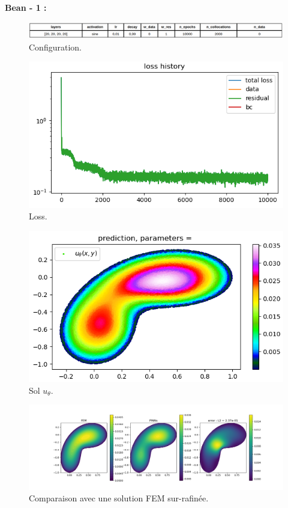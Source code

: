 \documentclass[french]{article}
\begin{document}
	\textbf{Bean - 1 :}
	
	\begin{figure}[H]
		\centering
		\includegraphics[width=\linewidth]{"poisson/bean/config_1.png"}
		\caption{Configuration.}
	\end{figure}
	
	\begin{minipage}{0.48\linewidth}
		\begin{figure}[H]
			\centering
			\includegraphics[width=0.9\linewidth]{"poisson/bean/loss_1.png"}
			\caption{Loss.}
		\end{figure}
	\end{minipage}
	\begin{minipage}{0.48\linewidth}
		\begin{figure}[H]
			\centering
			\includegraphics[width=0.9\linewidth]{"poisson/bean/sol_1.png"}
			\caption{Sol $u_\theta$.}
		\end{figure}
	\end{minipage}
	
	\begin{figure}[H]
		\centering
		\includegraphics[width=\linewidth]{"poisson/bean/compare_1.png"}
		\caption{Comparaison avec une solution FEM sur-rafinée.}
	\end{figure}
\end{document}
